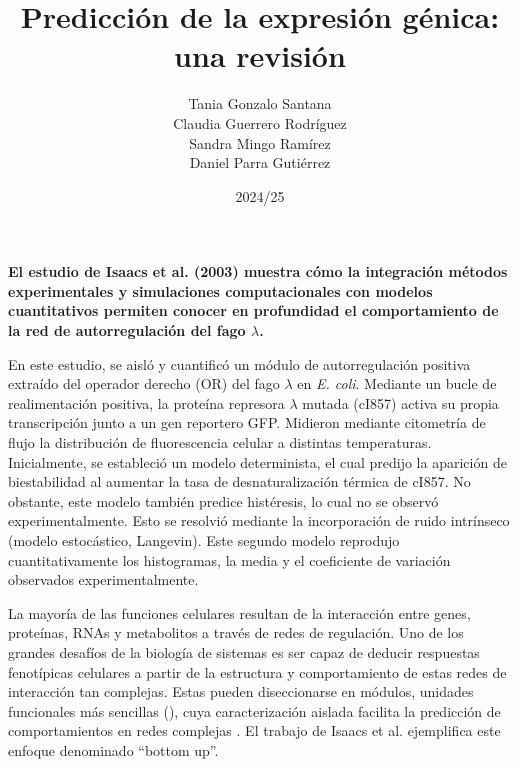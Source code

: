 \documentclass[nochap]{config/ejercicios}
\title{Predicción de la expresión génica: una revisión}
\author{Tania Gonzalo Santana \\ Claudia Guerrero Rodríguez \\ Sandra Mingo Ramírez \\ Daniel Parra Gutiérrez }
\date{2024/25}
\begin{document}
\maketitle

\large
\textbf{El estudio de Isaacs et al. (2003) muestra cómo la integración métodos experimentales y simulaciones computacionales con modelos cuantitativos permiten conocer en profundidad el comportamiento de la red de autorregulación del fago $\lambda$.}
\normalsize

En este estudio, se aisló y cuantificó un módulo de autorregulación positiva extraído del operador derecho (OR) del fago $\lambda$ en \textit{E. coli}. Mediante un bucle de realimentación positiva, la proteína represora $\lambda$ mutada (cI857) activa su propia transcripción junto a un gen reportero GFP. Midieron mediante citometría de flujo la distribución de fluorescencia celular a distintas temperaturas. Inicialmente, se estableció un modelo determinista, el cual predijo la aparición de biestabilidad al aumentar la tasa de desnaturalización térmica de cI857. No obstante, este modelo también predice histéresis, lo cual no se observó experimentalmente. Esto se resolvió mediante la incorporación de ruido intrínseco (modelo estocástico, Langevin). Este segundo modelo reprodujo cuantitativamente los histogramas, la media y el coeficiente de variación observados experimentalmente.

La mayoría de las funciones celulares resultan de la interacción entre genes, proteínas, RNAs y metabolitos a través de redes de regulación. Uno de los grandes desafíos de la biología de sistemas es ser capaz de deducir respuestas fenotípicas celulares a partir de la estructura y comportamiento de estas redes de interacción tan complejas. Estas pueden diseccionarse en módulos, unidades funcionales más sencillas (\cite{Hartwell1999}), cuya caracterización aislada facilita la predicción de comportamientos en redes complejas \cite{Arnone1997}. El trabajo de Isaacs et al. ejemplifica este enfoque  denominado “bottom up”.
\end{document}
